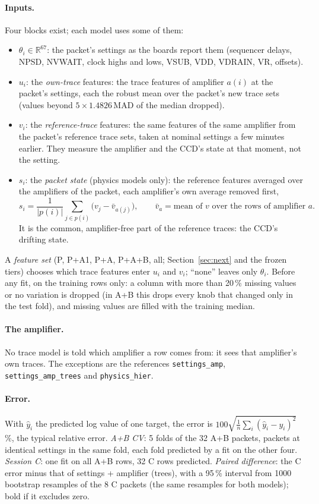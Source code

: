 \paragraph{Inputs.} Four blocks exist; each model uses some of them:
\begin{itemize}
\item $\theta_i\in\mathbb R^{67}$: the packet's settings as the boards report them (sequencer delays, NPSD, NVWAIT,
  clock highs and lows, VSUB, VDD, VDRAIN, VR, offsets).
\item $u_i$: the \emph{own-trace} features: the trace features of amplifier $a(i)$ at the packet's settings, each the
  robust mean over the packet's new trace sets (values beyond $5\times1.4826$\,MAD of the median dropped).
\item $v_i$: the \emph{reference-trace} features: the same features of the same amplifier from the packet's reference
  trace sets, taken at nominal settings a few minutes earlier. They measure the amplifier and the CCD's state at that
  moment, not the setting.
\item $s_i$: the \emph{packet state} (physics models only): the reference features averaged over the amplifiers of the
  packet, each amplifier's own average removed first,
  \[ s_i=\frac{1}{|p(i)|}\sum_{j\in p(i)}\big(v_j-\bar v_{a(j)}\big),\qquad \bar v_a=\text{mean of }v\text{ over the rows of amplifier }a. \]
  It is the common, amplifier-free part of the reference traces: the CCD's drifting state.
\end{itemize}
A \emph{feature set} (P, P+A1, P+A, P+A+B, all; Section~\ref{sec:next} and the frozen tiers) chooses which trace
features enter $u_i$ and $v_i$; ``none'' leaves only $\theta_i$. Before any fit, on the training rows only: a column
with more than 20\,\% missing values or no variation is dropped (in A+B this drops every knob that changed only in the
test fold), and missing values are filled with the training median.

\paragraph{The amplifier.} No trace model is told which amplifier a row comes from: it sees that amplifier's own
traces. The exceptions are the references \texttt{settings\_amp}, \texttt{settings\_amp\_trees} and
\texttt{physics\_hier}.

\paragraph{Error.} With $\hat y_i$ the predicted log value of one target, the error is
$100\sqrt{\tfrac1n\sum_i(\hat y_i-y_i)^2}$\,\%, the typical relative error. \emph{A+B CV}: 5 folds of the 32 A+B
packets, packets at identical settings in the same fold, each fold predicted by a fit on the other four.
\emph{Session C}: one fit on all A+B rows, 32 C rows predicted. \emph{Paired difference}: the C error minus that of
settings + amplifier (trees), with a 95\,\% interval from 1000 bootstrap resamples of the 8 C packets (the same
resamples for both models); bold if it excludes zero.

